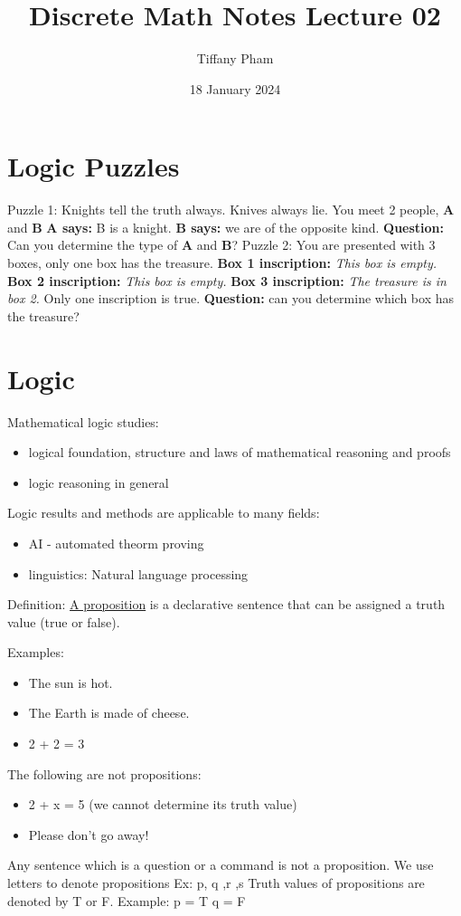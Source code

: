 \documentclass{article}
\title{Discrete Math Notes Lecture 02}
\author{Tiffany Pham}
\date{18 January 2024}
\begin{document}
\maketitle

\section{Logic Puzzles}
Puzzle 1:
\hfill \break
Knights tell the truth always.
\hfill \break
Knives always lie.
\hfill \break
You meet 2 people, \textbf{A} and \textbf{B}
\hfill \break
\textbf{A says:} B is a knight.
\hfill \break
\textbf{B says:} we are of the opposite kind.
\hfill \break
\textbf{Question:} Can you determine the type of \textbf{A} and \textbf{B}?
\hfill \break
\hfill \break
Puzzle 2:
\hfill \break
You are presented with 3 boxes, only one box has the treasure.
\hfill \break
\textbf{Box 1 inscription:} \textit{This box is empty.}
\hfill \break
\textbf{Box 2 inscription:} \textit{This box is empty.}
\hfill \break
\textbf{Box 3 inscription:} \textit{The treasure is in box 2.}
\hfill \break
Only one inscription is true.
\hfill \break
\textbf{Question:} can you determine which box has the treasure?

\section{Logic}
Mathematical logic studies:
\begin{itemize}
    \item logical foundation, structure and laws of mathematical reasoning and proofs
    \item logic reasoning in general
\end{itemize}
Logic results and methods are applicable to many fields:
\begin{itemize}
    \item AI - automated theorm proving
    \item linguistics: Natural language processing
\end{itemize}
Definition: \underline{A proposition} is a declarative sentence that can be assigned a truth value (true or false).

Examples:
\begin{itemize}
    \item The sun is hot.
    \item The Earth is made of cheese.
    \item 2 + 2 = 3
\end{itemize}
\hfill \break
The following are not propositions:
\begin{itemize}
    \item 2 + x = 5 (we cannot determine its truth value)
    \item Please don't go away!
\end{itemize}
Any sentence which is a question or a command is not a proposition.
\hfill \break
We use letters to denote propositions
\hfill \break
Ex: p, q ,r ,s
\hfill \break
Truth values of propositions are denoted by T or F.
\hfill \break
Example:
\hfill \break
p = T
\hfill \break
q = F
\end{document}
